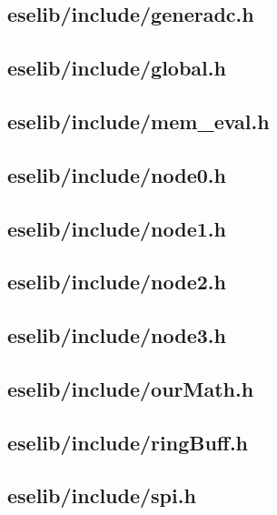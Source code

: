 \documentclass[12pt,a4paper,titlepage,oneside]{article}
\begin{document}
\subsection{eselib/include/generadc.h}

\newpage
\subsection{eselib/include/global.h}

\newpage
\subsection{eselib/include/mem\_eval.h}

\newpage
\subsection{eselib/include/node0.h}

\newpage
\subsection{eselib/include/node1.h}

\newpage
\subsection{eselib/include/node2.h}

\newpage
\subsection{eselib/include/node3.h}

\newpage
\subsection{eselib/include/ourMath.h}

\newpage
\subsection{eselib/include/ringBuff.h}

\newpage
\subsection{eselib/include/spi.h}

\newpage
\end{document}
